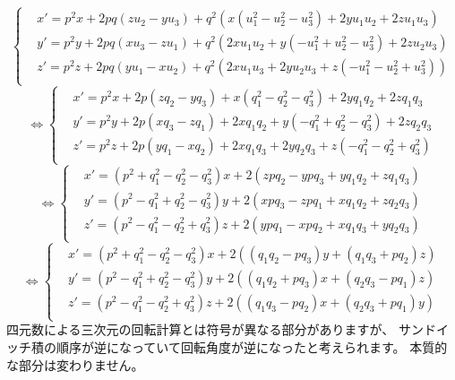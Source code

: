 \documentclass[a4paper,12pt,notitlepage]{jsreport}
\begin{document}
\begin{equation}
  \left\{
    \begin{aligned}
      &x' = p^2 x + 2 p q (z u_2 - y u_3) + q^2 (x (u_1^2 - u_2^2 - u_3^2) + 2 y u_1 u_2 + 2 z u_1 u_3) \\
      &y' = p^2 y + 2 p q (x u_3 - z u_1) + q^2 (2 x u_1 u_2 + y ( - u_1^2 + u_2^2 - u_3^2) + 2 z u_2 u_3) \\
      &z' = p^2 z + 2 p q (y u_1 - x u_2) + q^2 (2 x u_1 u_3 + 2 y u_2 u_3 + z ( - u_1^2 - u_2^2 + u_3^2)) \\
    \end{aligned}
  \right.
\end{equation}
\begin{equation}
  \Longleftrightarrow
  \left\{
    \begin{aligned}
      &x' = p^2 x + 2 p (z q_2 - y q_3) + x (q_1^2 - q_2^2 - q_3^2) + 2 y q_1 q_2 + 2 z q_1 q_3 \\
      &y' = p^2 y + 2 p (x q_3 - z q_1) + 2 x q_1 q_2 + y ( - q_1^2 + q_2^2 - q_3^2) + 2 z q_2 q_3 \\
      &z' = p^2 z + 2 p (y q_1 - x q_2) + 2 x q_1 q_3 + 2 y q_2 q_3 + z ( - q_1^2 - q_2^2 + q_3^2) \\
    \end{aligned}
  \right.
\end{equation}
\begin{equation}
  \Longleftrightarrow
  \left\{
    \begin{aligned}
      &x' = (p^2 + q_1^2 - q_2^2 - q_3^2) x + 2 (z p q_2 - y p q_3 + y q_1 q_2 + z q_1 q_3) \\
      &y' = (p^2 - q_1^2 + q_2^2 - q_3^2) y + 2 (x p q_3 - z p q_1 + x q_1 q_2 + z q_2 q_3) \\
      &z' = (p^2 - q_1^2 - q_2^2 + q_3^2) z + 2 (y p q_1 - x p q_2 + x q_1 q_3 + y q_2 q_3) \\
    \end{aligned}
  \right.
\end{equation}
\begin{equation}
  \Longleftrightarrow
  \left\{
    \begin{aligned}
      &x' = (p^2 + q_1^2 - q_2^2 - q_3^2) x + 2 ((q_1 q_2 - p q_3) y + (q_1 q_3 + p q_2) z) \\
      &y' = (p^2 - q_1^2 + q_2^2 - q_3^2) y + 2 ((q_1 q_2 + p q_3) x + (q_2 q_3 - p q_1) z) \\
      &z' = (p^2 - q_1^2 - q_2^2 + q_3^2) z + 2 ((q_1 q_3 - p q_2) x + (q_2 q_3 + p q_1) y) \\
    \end{aligned}
  \right.
\end{equation}
四元数による三次元の回転計算とは符号が異なる部分がありますが、
サンドイッチ積の順序が逆になっていて回転角度が逆になったと考えられます。
本質的な部分は変わりません。
\end{document}
